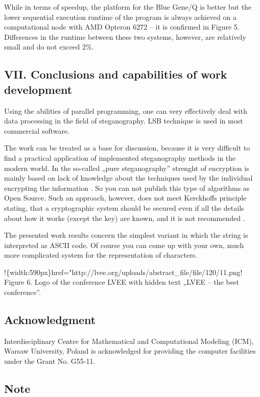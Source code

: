 \documentclass[10pt, a5paper]{article}
\begin{document}
While in terms of speedup, the platform for the Blue Gene/Q is better but the lower sequential execution runtime of the program is always achieved on a computational node with AMD Opteron 6272 -- it is confirmed in Figure 5. Differences in the runtime between these two systems, however, are relatively small and do not exceed 2\%.

\subsection*{VII. Conclusions and capabilities of work development}

Using the abilities of parallel programming, one  can very effectively deal with data processing in the field of steganography. LSB technique is used in most commercial software.

The work can be treated as a base for discussion, because it is very difficult to find a practical application of implemented steganography methods in the modern world. In the so-called „pure steganography” strenght of encryption is mainly based on lack of knowledge about the techniques used by the individual encrypting the information \footnotemark[7]. So you can not publish this type of algorithms as Open Source. Such an approach, however, does not meet Kerckhoffs principle \footnotemark[10] stating, that a cryptographic system should be secured even if all the details about how it works (except the key) are known, and it is not recommended .

The presented work results concern the simplest variant in which the string is interpreted as ASCII code. Of course you can come up with your own, much more complicated system for the representation of characters.

!\{width:590px\}href="http://lvee.org/uploads/abstract\_file/file/120/11.png!
Figure 6. Logo of the conference LVEE with hidden text „LVEE – the best conference”.

\subsection*{Acknowledgment}

Interdisciplinary Centre for Mathematical and Computational Modeling (ICM), Warsaw University, Poland is acknowledged for providing the computer facilities under the Grant No. G55-11.

\subsection*{Note}
\end{document}
